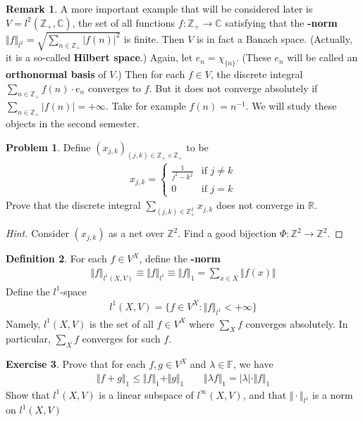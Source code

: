 \documentclass[12pt,b5paper,notitlepage]{article}
\theoremstyle{definition}
\newtheorem{df}{Definition}[section]
\newtheorem{exe}[df]{Exercise}
\newtheorem{rem}[df]{Remark}
\newtheorem{prob}{\color{red}Problem}[section]
\theoremstyle{plain}
\newcommand{\Cbb}{\mathbb C}
\newcommand{\Zbb}{\mathbb Z}
\newcommand{\Rbb}{\mathbb R}
\newcommand{\Fbb}{\mathbb F}
\newcommand{\dps}{\displaystyle}
\numberwithin{equation}{section}
\begin{document}
\begin{rem}
A more important example that will be considered later is $V=l^2(\Zbb_+,\Cbb)$, the set of all functions $f:\Zbb_+\rightarrow\Cbb$ satisfying that the \textbf{-norm} $\Vert f\Vert_{l^2}=\sqrt{\sum_{n\in\Zbb_+} |f(n)|^2}$ is finite. Then $V$ is in fact a Banach space. (Actually, it is a so-called \textbf{Hilbert space}.) Again, let $e_n=\chi_{\{n\}}$. (These $e_n$ will be called an \textbf{orthonormal basis} of $V$.) Then for each $f\in V$, the discrete integral $\sum_{n\in\Zbb_+}f(n)\cdot e_n$ converges to $f$. But it does not converge absolutely if $\sum_{n\in\Zbb_+}|f(n)|=+\infty$. Take for example $f(n)=n^{-1}$. We will study these objects in the second semester.
\end{rem}


\begin{prob}
Define $(x_{j,k})_{(j,k)\in\Zbb_+\times\Zbb_+}$ to be
\begin{align*}
x_{j,k}=\left\{
\begin{array}{ll}
\dps\frac 1{j^2-k^2}
 & \text{if }j\neq k\\[2ex]
0&\text{if }j=k
\end{array}\right.
\end{align*}
Prove that the discrete integral $\dps\sum_{(j,k)\in\Zbb_+^2}x_{j,k}$ does not converge in $\Rbb$.
\end{prob}

\begin{proof}[Hint]
Consider $(x_{j,k})$ as a net over $\Zbb^2$. Find a good bijection $\Phi:\Zbb^2\rightarrow\Zbb^2$.
\end{proof}




\begin{df}
For each $f\in V^X$, define the \textbf{-norm} 
\begin{align*}
\Vert f\Vert_{l^1(X,V)}\equiv\Vert f\Vert_{l^1}\equiv\Vert f\Vert_1=\sum_{x\in X}\Vert f(x)\Vert
\end{align*}
Define the $l^1$-space 
\begin{gather*}
l^1(X,V)=\{f\in V^X:\Vert f\Vert_{l^1}<+\infty \}
\end{gather*}
Namely, $l^1(X,V)$ is the set of all $f\in V^X$ where $\sum_Xf$ converges absolutely. In particular, $\sum_Xf$ converges for such $f$. 
\end{df}


\begin{exe}
Prove that for each $f,g\in V^X$ and $\lambda\in\Fbb$, we have
\begin{gather}
\Vert f+g\Vert_1\leq \Vert f\Vert_1+\Vert g\Vert_1\qquad \Vert\lambda f\Vert_1=|\lambda|\cdot\Vert f\Vert_1
\end{gather}
Show that $l^1(X,V)$ is a linear subspace of $l^\infty(X,V)$, and that $\Vert\cdot\Vert_{l^1}$ is a norm on $l^1(X,V)$
\end{exe}
\end{document}
